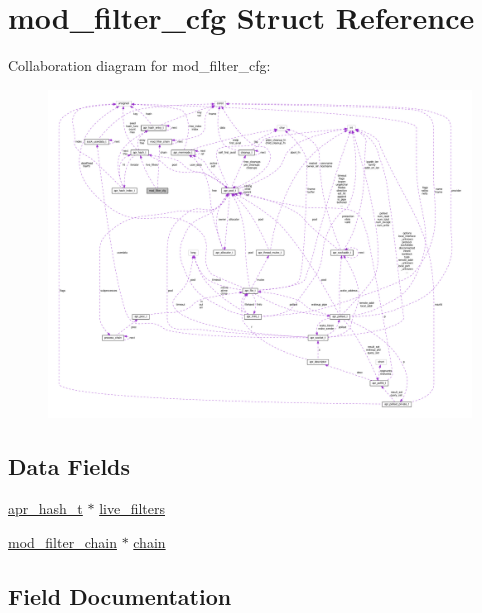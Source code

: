 \hypertarget{structmod__filter__cfg}{}\section{mod\+\_\+filter\+\_\+cfg Struct Reference}
\label{structmod__filter__cfg}


Collaboration diagram for mod\+\_\+filter\+\_\+cfg\+:
\nopagebreak
\begin{figure}[H]
\begin{center}
\leavevmode
\includegraphics[width=350pt]{structmod__filter__cfg__coll__graph}
\end{center}
\end{figure}
\subsection*{Data Fields}
\begin{DoxyCompactItemize}
\item 
\hyperlink{structapr__hash__t}{apr\+\_\+hash\+\_\+t} $\ast$ \hyperlink{structmod__filter__cfg_a6cf01a51d1ac5da5030147905268b2ff}{live\+\_\+filters}
\item 
\hyperlink{structmod__filter__chain}{mod\+\_\+filter\+\_\+chain} $\ast$ \hyperlink{structmod__filter__cfg_a5dd26726d31254948134dd0e9e485a25}{chain}
\end{DoxyCompactItemize}


\subsection{Field Documentation}
